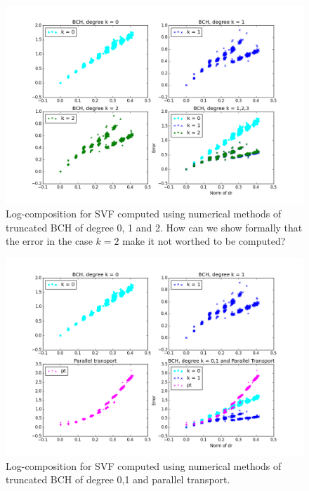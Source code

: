 \begin{figure}[!ht]
	\hspace{-3cm}
	\includegraphics[scale=0.65]{figures/SVF_four_bch.png}
	\caption{Log-composition for SVF computed using numerical methods of truncated BCH of degree 0, 1 and 2. How can we show formally that the error in the case $k=2$ make it not worthed to be computed?}
	\label{fig:SVF_four_bch}
\end{figure}

\begin{figure}[!ht]
	\hspace{-3cm}
	\includegraphics[scale=0.65]{figures/SVF_bch_parallel_transport.png}
	\caption{Log-composition for SVF computed using numerical methods of truncated BCH of degree 0,1 and parallel transport.}
	\label{fig:SVF_bch_parallel_transport}
\end{figure}

